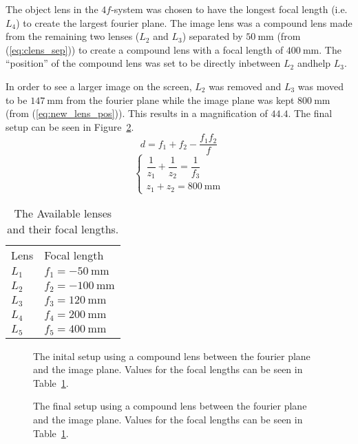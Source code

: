 \documentclass[12pt,a4paper]{article}
\begin{document}
The object lens in the $4f$-system was chosen to have the longest focal length (i.e. $L_4$) to create the largest fourier plane. The image lens was a compound lens made from the remaining two lenses ($L_2$ and $L_3$) separated by $\SI{50}{\milli\metre}$ (from (\ref{eq:clens_sep})) to create a compound lens with a focal length of $\SI{400}{\milli\metre}$. The ``position'' of the compound lens was set to be directly inbetween $L_2$ andhelp $L_3$.

In order to see a larger image on the screen, $L_2$ was removed and $L_3$ was moved to be $\SI{147}{\milli\metre}$ from the fourier plane while the image plane was kept $\SI{800}{\milli\metre}$ (from (\ref{eq:new_lens_pos})). This results in a magnification of $44.4$. The final setup can be seen in Figure~\ref{fig:setup_final}.
\begin{equation}
  \label{eq:clens_sep}
  d=f_1+f_2-\frac{f_1f_2}{f}
\end{equation}
\begin{equation}
  \label{eq:new_lens_pos}
  \begin{cases}
    \dfrac{1}{z_1}+\dfrac{1}{z_2}=\dfrac{1}{f_3} \\
    z_1+z_2=\SI{800}{\milli\metre}
  \end{cases}
\end{equation}
\begin{table}
  \centering
  \begin{tabular}{|l|l|}\hline
    Lens & Focal length \\
    $L_1$ & $f_1=\SI{-50}{\milli\metre}$ \\
    $L_2$ & $f_2=\SI{-100}{\milli\metre}$ \\
    $L_3$ & $f_3=\SI{120}{\milli\metre}$ \\
    $L_4$ & $f_4=\SI{200}{\milli\metre}$ \\
    $L_5$ & $f_5=\SI{400}{\milli\metre}$ \\ \hline
  \end{tabular}
  \caption{The Available lenses and their focal lengths.}
  \label{tab:lenses}
\end{table}
\begin{figure}
  \centering
  \noindent\makebox[\textwidth]{\scalebox{0.70}{}}
  \caption{The inital setup using a compound lens between the fourier plane and the image plane. Values for the focal lengths can be seen in Table~\ref{tab:lenses}.}
  \label{fig:setup0}
\end{figure}
\begin{figure}
  \centering
  \noindent\makebox[\textwidth]{\scalebox{0.70}{}}
  \caption{The final setup using a compound lens between the fourier plane and the image plane. Values for the focal lengths can be seen in Table~\ref{tab:lenses}.}
  \label{fig:setup_final}
\end{figure}
\end{document}

